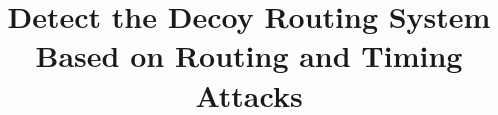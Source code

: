 \documentclass[conference]{IEEEtran}
\begin{document}
\title{Detect the Decoy Routing System Based on Routing and Timing Attacks\\
}
\maketitle
\end{document}
